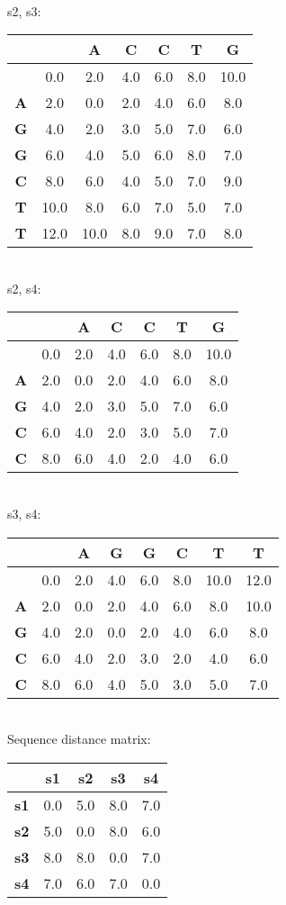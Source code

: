 \documentclass[a4paper,10pt,oneside,reqno]{scrartcl}
\begin{document}
\\[2mm]s2, s3: \\
\begin{tabular}{c|cccccc}
& \textbf{ } & \textbf{A} & \textbf{C} & \textbf{C} & \textbf{T} & \textbf{G}\\\hline
\textbf{ } & 0.0 & 2.0 & 4.0 & 6.0 & 8.0 & 10.0\\
\textbf{A} & 2.0 & 0.0 & 2.0 & 4.0 & 6.0 & 8.0\\
\textbf{G} & 4.0 & 2.0 & 3.0 & 5.0 & 7.0 & 6.0\\
\textbf{G} & 6.0 & 4.0 & 5.0 & 6.0 & 8.0 & 7.0\\
\textbf{C} & 8.0 & 6.0 & 4.0 & 5.0 & 7.0 & 9.0\\
\textbf{T} & 10.0 & 8.0 & 6.0 & 7.0 & 5.0 & 7.0\\
\textbf{T} & 12.0 & 10.0 & 8.0 & 9.0 & 7.0 & 8.0\\
\end{tabular}
\\[2mm]s2, s4: \\
\begin{tabular}{c|cccccc}
& \textbf{ } & \textbf{A} & \textbf{C} & \textbf{C} & \textbf{T} & \textbf{G}\\\hline
\textbf{ } & 0.0 & 2.0 & 4.0 & 6.0 & 8.0 & 10.0\\
\textbf{A} & 2.0 & 0.0 & 2.0 & 4.0 & 6.0 & 8.0\\
\textbf{G} & 4.0 & 2.0 & 3.0 & 5.0 & 7.0 & 6.0\\
\textbf{C} & 6.0 & 4.0 & 2.0 & 3.0 & 5.0 & 7.0\\
\textbf{C} & 8.0 & 6.0 & 4.0 & 2.0 & 4.0 & 6.0\\
\end{tabular}
\\[2mm]s3, s4: \\
\begin{tabular}{c|ccccccc}
& \textbf{ } & \textbf{A} & \textbf{G} & \textbf{G} & \textbf{C} & \textbf{T} & \textbf{T}\\\hline
\textbf{ } & 0.0 & 2.0 & 4.0 & 6.0 & 8.0 & 10.0 & 12.0\\
\textbf{A} & 2.0 & 0.0 & 2.0 & 4.0 & 6.0 & 8.0 & 10.0\\
\textbf{G} & 4.0 & 2.0 & 0.0 & 2.0 & 4.0 & 6.0 & 8.0\\
\textbf{C} & 6.0 & 4.0 & 2.0 & 3.0 & 2.0 & 4.0 & 6.0\\
\textbf{C} & 8.0 & 6.0 & 4.0 & 5.0 & 3.0 & 5.0 & 7.0\\
\end{tabular}
\\[2mm]Sequence distance matrix: 
\begin{tabular}{c|cccc}
& \textbf{s1} & \textbf{s2} & \textbf{s3} & \textbf{s4}\\\hline
\textbf{s1} & 0.0 & 5.0 & 8.0 & 7.0\\
\textbf{s2} & 5.0 & 0.0 & 8.0 & 6.0\\
\textbf{s3} & 8.0 & 8.0 & 0.0 & 7.0\\
\textbf{s4} & 7.0 & 6.0 & 7.0 & 0.0\\
\end{tabular} \\
\end{document}
